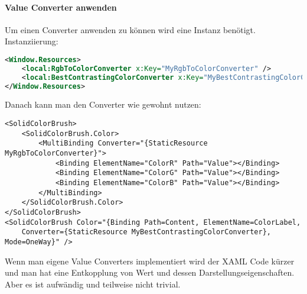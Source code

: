 \paragraph{Value Converter anwenden} Um einen Converter anwenden zu können wird eine Instanz benötigt. Instanziierung:
\begin{lstlisting}[language=xml, caption="Instanzieren"]
<Window.Resources>
    <local:RgbToColorConverter x:Key="MyRgbToColorConverter" />
    <local:BestContrastingColorConverter x:Key="MyBestContrastingColorConverter" />
</Window.Resources>
\end{lstlisting}
Danach kann man den Converter wie gewohnt nutzen:
\begin{lstlisting}
<SolidColorBrush>
    <SolidColorBrush.Color>
        <MultiBinding Converter="{StaticResource MyRgbToColorConverter}">
            <Binding ElementName="ColorR" Path="Value"></Binding>
            <Binding ElementName="ColorG" Path="Value"></Binding>
            <Binding ElementName="ColorB" Path="Value"></Binding>
        </MultiBinding>
    </SolidColorBrush.Color>
</SolidColorBrush>
<SolidColorBrush Color="{Binding Path=Content, ElementName=ColorLabel,
    Converter={StaticResource MyBestContrastingColorConverter}, Mode=OneWay}" />
\end{lstlisting}
Wenn man eigene Value Converters implementiert wird der XAML Code kürzer und man hat eine Entkopplung von Wert und dessen Darstellungseigenschaften. Aber es ist aufwändig und teilweise nicht trivial.
